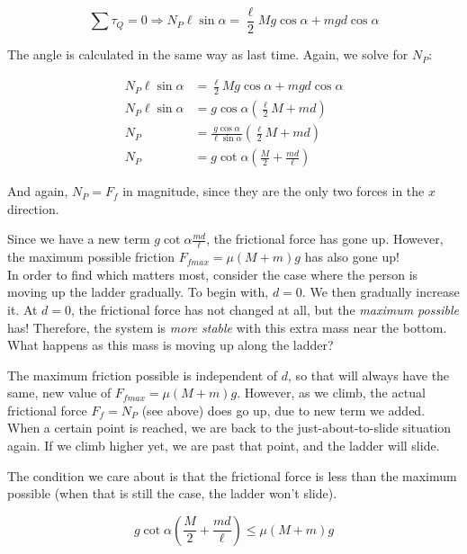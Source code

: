 \begin{equation}
\sum \tau_Q = 0 \Rightarrow N_P \ell \sin \alpha = \frac{\ell}{2} M g \cos \alpha + m g d \cos \alpha
\end{equation}

The angle is calculated in the same way as last time. Again, we solve for $N_P$:

\begin{align}
N_P \ell \sin \alpha &= \frac{\ell}{2} M g \cos \alpha + m g d \cos \alpha\\
N_P \ell \sin \alpha &= g \cos \alpha \left(\frac{\ell}{2} M + m d\right)\\
N_P &= \frac{g \cos \alpha}{\ell \sin \alpha} \left(\frac{\ell}{2} M + m d\right)\\
N_P &= g \cot \alpha \left(\frac{M}{2} + \frac{m d}{\ell}\right)
\end{align}

And again, $N_P = F_f$ in magnitude, since they are the only two forces in the $x$ direction.

Since we have a new term $\displaystyle g \cot \alpha \frac{m d}{\ell}$, the frictional force has gone up. However, the maximum possible friction $F_{fmax} = \mu (M + m) g$ has also gone up!\\
In order to find which matters most, consider the case where the person is moving up the ladder gradually. To begin with, $d = 0$. We then gradually increase it. At $d = 0$, the frictional force has not changed at all, but the \emph{maximum possible} has! Therefore, the system is \emph{more stable} with this extra mass near the bottom. What happens as this mass is moving up along the ladder?

The maximum friction possible is independent of $d$, so that will always have the same, new value of $F_{fmax} = \mu (M + m) g$. However, as we climb, the actual frictional force $F_f = N_P$ (see above) does go up, due to new term we added.\\
When a certain point is reached, we are back to the just-about-to-slide situation again. If we climb higher yet, we are past that point, and the ladder will slide.

The condition we care about is that the frictional force is less than the maximum possible (when that is still the case, the ladder won't slide).

\begin{equation}
g \cot \alpha \left(\frac{M}{2} + \frac{m d}{\ell}\right) \le \mu (M + m) g
\end{equation}

